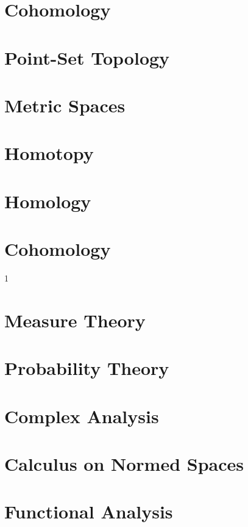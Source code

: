 \documentclass{book}                                                           %
\newcommand*{\TOPPATH}{books}
\newcommand*{\PATH}{\TOPPATH/}
\newcounter{endpage}
\def\compileanalysis{0}
\begin{document}
        \part{Cohomology}
    \else
        \part{Point-Set Topology}
        \part{Metric Spaces}
        \part{Homotopy}
        \part{Homology}
        \part{Cohomology}
    \fi
    \clearpage

    \setcounter{endpage}{\thepage}
    \label{book:Analysis}%
    \renewcommand{\PATH}{\TOPPATH/Analysis}
    \setcounter{page}{\value{endpage}}

    \if\compileanalysis1
        \part{Measure Theory}
            
        \part{Probability Theory}
            
        \part{Complex Analysis}
            
        \part{Calculus on Normed Spaces}
            
        \part{Functional Analysis}
            
\end{document}
